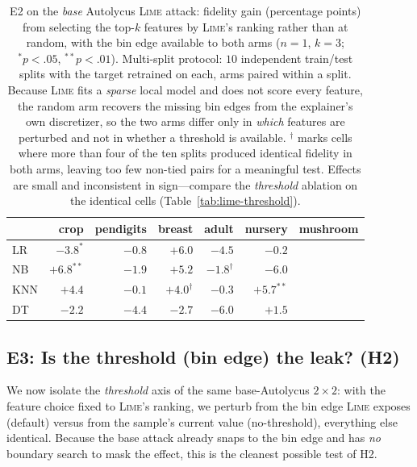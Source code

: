 \documentclass[sigconf,anonymous,review]{acmart}
\begin{document}
\begin{table}[t]
\centering
\caption{E2 on the \emph{base} Autolycus \textsc{Lime} attack: fidelity gain (percentage points) from
selecting the top-$k$ features by \textsc{Lime}'s ranking rather than at random, with the bin edge
available to both arms ($n{=}1$, $k{=}3$; $^{*}p{<}.05$, $^{**}p{<}.01$). Multi-split protocol: $10$
independent train/test splits with the target retrained on each, arms paired within a split. Because
\textsc{Lime} fits a \emph{sparse} local model and does not score every feature, the random arm
recovers the missing bin edges from the explainer's own discretizer, so the two arms differ only in
\emph{which} features are perturbed and not in whether a threshold is available. $^{\dag}$ marks cells
where more than four of the ten splits produced identical fidelity in both arms, leaving too few
non-tied pairs for a meaningful test. Effects are small and inconsistent in sign---compare the
\emph{threshold} ablation on the identical cells (Table~\ref{tab:lime-threshold}).}
\label{tab:lime-attr}
\begin{tabular}{lrrrrrr}
\toprule
 & crop & pendigits & breast & adult & nursery & mushroom \\
\midrule
LR  & $-3.8^{*}$  & $-0.8$ & $+6.0$      & $-4.5$        & $-0.2$      & \\
NB  & $+6.8^{**}$ & $-1.9$ & $+5.2$      & $-1.8^{\dag}$ & $-6.0$      & \\
KNN & $+4.4$      & $-0.1$ & $+4.0^{\dag}$ & $-0.3$      & $+5.7^{**}$ & \\
DT  & $-2.2$      & $-4.4$ & $-2.7$      & $-6.0$        & $+1.5$      & \\
\bottomrule
\end{tabular}
\end{table}

\subsection{E3: Is the threshold (bin edge) the leak? (H2)}
\label{subsec:e3}
We now isolate the \emph{threshold} axis of the same base-Autolycus $2{\times}2$: with the feature
choice fixed to \textsc{Lime}'s ranking, we perturb from the bin edge \textsc{Lime} exposes (default)
versus from the sample's current value (no-threshold), everything else identical. Because the base
attack already snaps to the bin edge and has \emph{no} boundary search to mask the effect, this is
the cleanest possible test of H2.
\end{document}
